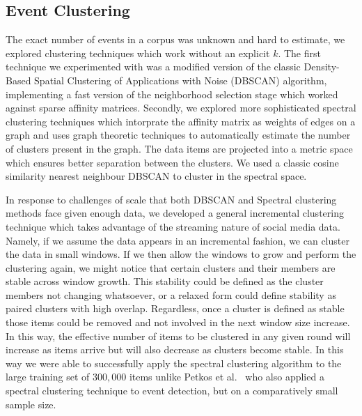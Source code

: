 \documentclass{../acm_proc_article-me11_tweaked}
\begin{document}

\subsection{Event Clustering} %
\label{sub:event_clustering}

The exact number of events in a corpus was unknown and hard to estimate, we explored clustering techniques which work without an explicit $k$. The first technique we experimented with was a modified version of the classic Density-Based Spatial Clustering of Applications with Noise  (DBSCAN) algorithm, implementing a fast version of the neighborhood selection stage which worked against sparse affinity matrices. Secondly, we explored more sophisticated spectral clustering techniques which intorprate   the affinity matrix as weights of edges on a graph and uses graph theoretic techniques to automatically estimate the number of clusters present in the graph. The data items are projected into a metric space which ensures better separation between the clusters. We used a classic cosine similarity nearest neighbour DBSCAN to cluster in the spectral space. 

In response to challenges of scale that both DBSCAN and Spectral clustering methods face given enough data, we developed a general incremental clustering technique which takes advantage of the streaming nature of social media data. Namely, if we assume the data appears in an incremental fashion, we can cluster the data in small windows. If we then allow the windows to grow and perform the clustering again, we might notice that certain clusters and their members are stable across window growth. This stability could be defined as the cluster members not changing whatsoever, or a relaxed form could define stability as paired clusters with high overlap. Regardless, once a cluster is defined as stable those items could be removed and not involved in the next window size increase. In this way, the effective number of items to be clustered in any given round will increase as items arrive but will also decrease as clusters become stable. In this way we were able to successfully apply the spectral clustering algorithm to the large training set of $300,000$ items unlike Petkos et al.~\cite{Petkos:2012:SED:2324796.2324825} who also applied a spectral clustering technique to event detection, but on a comparatively small sample size.
\end{document}
